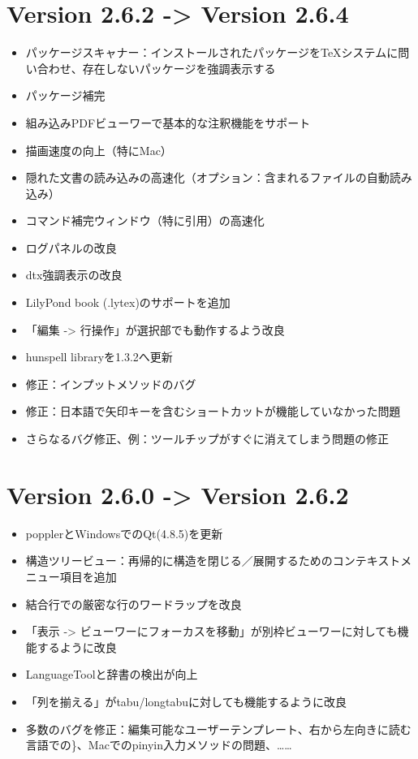 \section{Version 2.6.2 -\textgreater{} Version 2.6.4}

\begin{itemize}
\item
  パッケージスキャナー：インストールされたパッケージをTeXシステムに問い合わせ、存在しないパッケージを強調表示する
\item
  パッケージ補完
\item
  組み込みPDFビューワーで基本的な注釈機能をサポート
\item
  描画速度の向上（特にMac）
\item
  隠れた文書の読み込みの高速化（オプション：含まれるファイルの自動読み込み）
\item
  コマンド補完ウィンドウ（特に引用）の高速化
\item
  ログパネルの改良
\item
  dtx強調表示の改良
\item
  LilyPond book (.lytex)のサポートを追加
\item
  「編集 -\textgreater{} 行操作」が選択部でも動作するよう改良
\item
  hunspell libraryを1.3.2へ更新
\item
  修正：インプットメソッドのバグ
\item
  修正：日本語で矢印キーを含むショートカットが機能していなかった問題
\item
  さらなるバグ修正、例：ツールチップがすぐに消えてしまう問題の修正
\end{itemize}

\section{Version 2.6.0 -\textgreater{} Version 2.6.2}

\begin{itemize}
\item
  popplerとWindowsでのQt(4.8.5)を更新
\item
  構造ツリービュー：再帰的に構造を閉じる／展開するためのコンテキストメニュー項目を追加
\item
  結合行での厳密な行のワードラップを改良
\item
  「表示 -\textgreater{}
  ビューワーにフォーカスを移動」が別枠ビューワーに対しても機能するように改良
\item
  LanguageToolと辞書の検出が向上
\item
  「列を揃える」がtabu/longtabuに対しても機能するように改良
\item
  多数のバグを修正：編集可能なユーザーテンプレート、右から左向きに読む言語での\}、Macでのpinyin入力メソッドの問題、……
\end{itemize}

